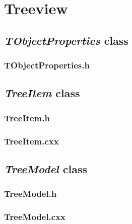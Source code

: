 \chapter{Treeview}

\section{\textit{TObjectProperties} class}

\subsection{TObjectProperties.h}


\newpage


\section{\textit{TreeItem} class}

\subsection{TreeItem.h}


\newpage

\subsection{TreeItem.cxx}


\newpage


\section{\textit{TreeModel} class}

\subsection{TreeModel.h}


\newpage

\subsection{TreeModel.cxx}


\newpage


